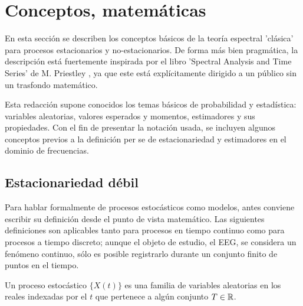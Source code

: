 
\section{Conceptos, matem\'aticas}

En esta secci\'on se describen los conceptos b\'asicos de la teor\'ia espectral 'cl\'asica' para 
procesos estacionarios y no-estacionarios. 
De forma m\'as bien pragm\'atica, la descripci\'on est\'a
 fuertemente inspirada por el libro 'Spectral Analysis and Time Series' 
de M. Priestley \cite{Priestley81}, ya que este est\'a expl\'icitamente dirigido a un p\'ublico 
sin un trasfondo matem\'atico.

Esta redacci\'on supone conocidos los temas b\'asicos de probabilidad y estad\'istica:
variables aleatorias, valores esperados y momentos, estimadores y sus propiedades.
Con el fin de presentar la notaci\'on usada, se incluyen algunos conceptos previos a la 
definici\'on per se de estacionariedad y estimadores en el dominio de frecuencias.


\subsection{Estacionariedad d\'ebil}

Para hablar formalmente de procesos estoc\'asticos como modelos, antes 
conviene escribir su definici\'on desde el punto de vista matem\'atico. Las siguientes definiciones
son aplicables tanto para procesos en tiempo continuo
como para procesos a tiempo discreto; aunque el objeto de estudio, el EEG, se considera 
un fen\'omeno continuo, s\'olo es posible registrarlo durante un conjunto finito de puntos 
en el tiempo.

\begin{defn}
Un proceso estoc\'astico $\{ X(t) \}$ es una familia de variables aleatorias 
en los reales
indexadas por el 
$t$ que pertenece a alg\'un conjunto $T \in \mathbb{R}$.
\end{defn}

